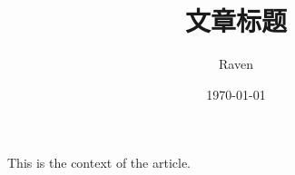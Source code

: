 \documentclass[UTF8]{ctexart}
\title{文章标题}
\author{Raven}
\date{\today}
\begin{document}
    \maketitle
    This is the context of the article.
\end{document}
